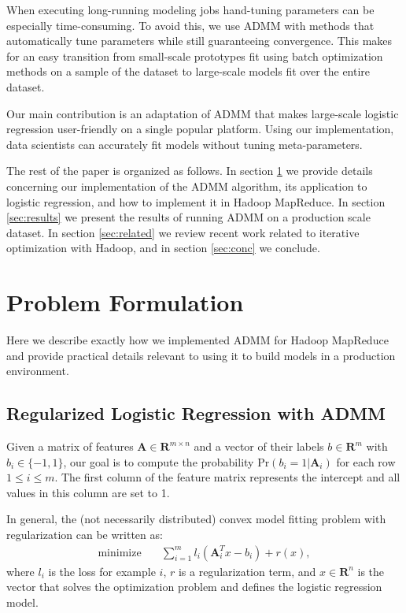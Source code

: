 \documentclass[10pt, conference, compsocconf]{IEEEtran}
\begin{document}
When executing long-running modeling jobs hand-tuning parameters can be especially time-consuming.  To avoid this, we use ADMM with methods that automatically tune parameters while still guaranteeing convergence.  This makes for an easy transition from small-scale prototypes fit using batch optimization methods on a sample of the dataset to large-scale models fit over the entire dataset.

Our main contribution is an adaptation of ADMM that makes large-scale logistic regression user-friendly on a single popular platform.  Using our implementation, data scientists can accurately fit models without tuning meta-parameters.

The rest of the paper is organized as follows.  In section \ref{sec:imp} we provide details concerning our implementation of the ADMM algorithm, its application to logistic regression, and how to implement it in Hadoop MapReduce.  In section \ref{sec:results} we present the results of running ADMM on a production scale dataset.  In section \ref{sec:related} we review recent work related to iterative optimization with Hadoop, and in section \ref{sec:conc} we conclude.

\section{Problem Formulation}\label{sec:imp}
Here we describe exactly how we implemented ADMM for Hadoop MapReduce and provide practical details relevant to using it to build models in a production environment.

\subsection{Regularized Logistic Regression with ADMM}
Given a matrix of features $\mathbf{A}\in\mathbf{R}^{m\times n}$ and a vector of their labels $b\in\mathbf{R}^m$ with $b_i\in\{-1,1\}$, our goal is to compute the probability $\text{Pr}(b_i=1|\mathbf{A}_i)$ for each row $1\leq i\leq m$.  The first column of the feature matrix represents the intercept and all values in this column are set to 1.

In general, the (not necessarily distributed) convex model fitting problem with regularization can be written as:
\begin{align*}
\text{minimize}&\quad \sum_{i=1}^m l_i(\mathbf{A}_i^Tx - b_i) + r(x),
\end{align*}
where $l_i$ is the loss for example $i$, $r$ is a regularization term, and $x\in\mathbf{R}^n$ is the vector that solves the optimization problem and defines the logistic regression model.
\end{document}
